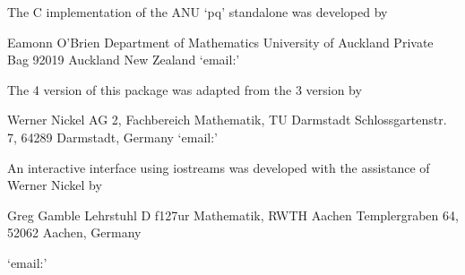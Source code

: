 
The C implementation of the ANU `pq' standalone was developed by

\begintt
Eamonn O'Brien
Department of Mathematics
University of Auckland
Private Bag 92019
Auckland
New Zealand
\endtt
{}`email:' 

The {\GAP} 4 version of this package was adapted from the {\GAP} 3
version by  

\begintt
Werner Nickel
AG 2, Fachbereich Mathematik, TU Darmstadt
Schlossgartenstr. 7, 64289 Darmstadt, Germany
\endtt
{}`email:' 

An  interactive  interface  using  iostreams  was  developed   with   the
assistance of Werner Nickel by

{}Greg Gamble
Lehrstuhl D f\accent127ur Mathematik, RWTH Aachen
Templergraben 64, 52062 Aachen, Germany

{}`email:' 


